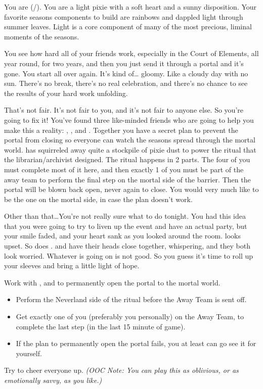 \documentclass[char]{PP}
\begin{document}
\name{\cESweet{}}

You are \cESweet{} (\cESweet{\They}/\cESweet{\Them}). You are a light pixie with a soft heart and a sunny disposition. Your favorite seasons components to build are rainbows and dappled light through summer leaves. Light is a core component of many of the most precious, liminal moments of the seasons.

You see how hard all of your friends work, especially in the Court of Elements, all year round, for two years, and then you just send it through a portal and it’s gone. You start all over again. It’s kind of… gloomy. Like a cloudy day with no sun. There’s no break, there’s no real celebration, and there’s no chance to see the results of your hard work unfolding.

That’s not fair. It’s not fair to you, and it’s not fair to anyone else. So you’re going to fix it! You’ve found three like-minded friends who are going to help you make this a reality: \cSLibrarian{}, \cFHeart{}, and \cMIron{}. Together you have a secret plan to prevent the portal from closing so everyone can watch the seasons spread through the mortal world. \cMIron{} has squirreled away quite a stockpile of pixie dust to power the ritual that the librarian/archivist designed. The ritual happens in 2 parts. The four of you must complete most of it here, and then exactly 1 of you must be part of the away team to perform the final step on the mortal side of the barrier. Then the portal will be blown back open, never again to close. You would very much like to be the one on the mortal side, in case the plan doesn’t work.

Other than that\ldots You’re not really sure what to do tonight. You had this idea that you were going to try to liven up the event and have an actual party, but your smile faded, and your heart sank as you looked around the room. \cFButterfly{} looks upset. So does \cMHead{}. \cSHead{} and \cEHead{} have their heads close together, whispering, and they both look worried. Whatever is going on is not good. So you guess it’s time to roll up your sleeves and bring a little light of hope.

\begin{itemz}
	\item Work with \cSLibrarian{}, \cFHeart{} and \cMIron{} to permanently open the portal to the mortal world.
	\begin{itemize}
		\item Perform the Neverland side of the ritual before the Away Team is sent off.
		\item Get exactly one of you (preferably you personally) on the Away Team, to complete the last step (in the last 15 minute of game).
		\item If the plan to permanently open the portal fails, you at least can go see it for yourself.
	\end{itemize}
	\item Try to cheer everyone up. \textit{(OOC Note: You can play this as oblivious, or as emotionally savvy, as you like.)}
\end{itemz}
\end{document}
